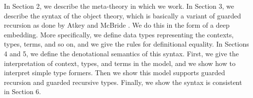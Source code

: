 In Section 2, we describe the meta-theory in which we work.
In Section 3, we describe the syntax of the object theory, which is basically a variant of guarded recursion as done by Atkey and McBride \cite{atkey2013productive}.
We do this in the form of a deep embedding.
More specifically, we define data types representing the contexts, types, terms, and so on, and we give the rules for definitional equality.
In Sections 4 and 5, we define the denotational semantics of this syntax.
First, we give the interpretation of context, types, and terms in the model, and we show how to interpret simple type formers.
Then we show this model supports guarded recursion and guarded recursive types.
Finally, we show the syntax is consistent in Section 6.


